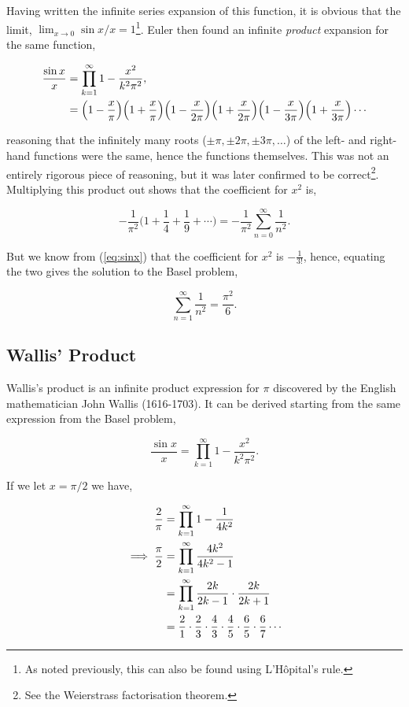 \documentclass[11pt]{amsart}
\begin{document}
Having written the infinite series expansion of this function, it is obvious that the limit, $\lim_{x\to 0} \sin x / x = 1$\footnote{As noted previously, this can also be found using L'H\^{o}pital's rule.}. Euler then found an infinite \emph{product} expansion for the same function,

\begin{align}
\frac{\sin x}{x} &= \prod_{k=1}^{\infty}1 - \frac{x^2}{k^2\pi^2}, \notag \\
&= \Big(1 - \frac{x}{\pi}\Big)\Big(1 + \frac{x}{\pi}\Big)\Big(1 - \frac{x}{2\pi}\Big)\Big(1 + \frac{x}{2\pi}\Big)\Big(1 - \frac{x}{3\pi}\Big)\Big(1 + \frac{x}{3\pi}\Big)\cdots \notag
\end{align}

reasoning that the infinitely many roots ($\pm\pi, \pm2\pi, \pm3\pi, \dots $) of the left- and right-hand functions were the same, hence the functions themselves. This was not an entirely rigorous piece of reasoning, but it was later confirmed to be correct\footnote{See the Weierstrass factorisation theorem.}. Multiplying this product out shows that the coefficient for $x^2$ is,

$$
-\frac{1}{\pi^2}\Big(1 + \frac{1}{4} + \frac{1}{9} + \cdots \Big)= -\frac{1}{\pi^2}\sum_{n=0}^{\infty}\frac{1}{n^2}.
$$

But we know from (\ref{eq:sinx}) that the coefficient for $x^2$ is $-\frac{1}{3!}$, hence, equating the two gives the solution to the Basel problem,

$$
\sum_{n=1}^{\infty}\frac{1}{n^2} = \frac{\pi^2}{6}.
$$

\subsection{Wallis' Product}

Wallis's product is an infinite product expression for $\pi$ discovered by the English mathematician John Wallis (1616-1703). It can be derived starting from the same expression from the Basel problem,

$$
\frac{\sin x}{x} = \prod_{k=1}^{\infty}1 - \frac{x^2}{k^2\pi^2}.
$$

If we let $x = \pi/2$ we have,

\begin{align}
\frac{2}{\pi} &= \prod_{k=1}^{\infty}1 - \frac{1}{4k^2} \notag \\
\implies \frac{\pi}{2} &= \prod_{k=1}^{\infty} \frac{4k^2}{4k^2 - 1} \notag \\
&= \prod_{k=1}^{\infty} \frac{2k}{2k - 1} \cdot \frac{2k}{2k + 1} \notag \\
&= \frac{2}{1} \cdot \frac{2}{3} \cdot \frac{4}{3} \cdot \frac{4}{5} \cdot \frac{6}{5} \cdot \frac{6}{7} \cdots \notag
\end{align}
\end{document}
